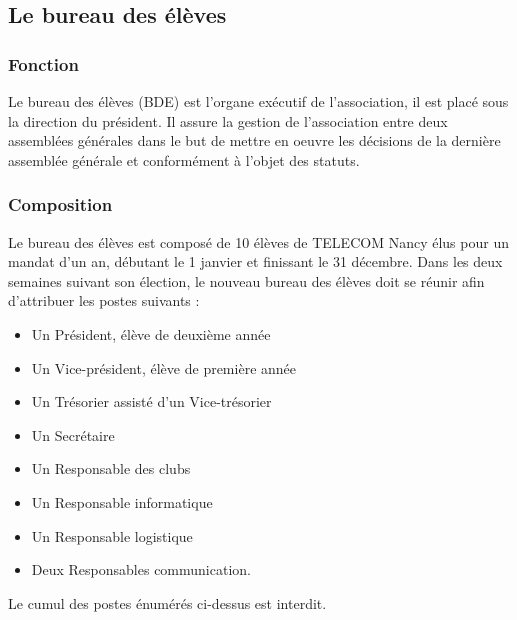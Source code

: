 \documentclass{article}
\begin{document}
		\subsection{Le bureau des élèves}
		\label{ssec:bde}
			\subsubsection{Fonction}
				Le bureau des élèves (BDE) est l'organe exécutif de
				l'association, il est placé sous la direction du président. Il
				assure la gestion de l'association entre deux assemblées
				générales dans le but de mettre en oeuvre les décisions de la
				dernière assemblée générale et conformément à l'objet des
				statuts.

			\subsubsection{Composition}
				Le bureau des élèves est composé de 10 élèves de TELECOM Nancy
				élus pour un mandat d’un an, débutant le 1 janvier et
				finissant le 31 décembre. Dans les deux semaines suivant son
				élection, le nouveau bureau des élèves doit se réunir afin
				d'attribuer les postes suivants :
				\begin{itemize}
					\item Un Président, élève de deuxième année
					\item Un Vice-président, élève de première année
					\item Un Trésorier assisté d’un Vice-trésorier
					\item Un Secrétaire
					\item Un Responsable des clubs
					\item Un Responsable informatique
					\item Un Responsable logistique
					\item Deux Responsables communication.
				\end{itemize}

				Le cumul des postes énumérés ci-dessus est interdit.
\end{document}
